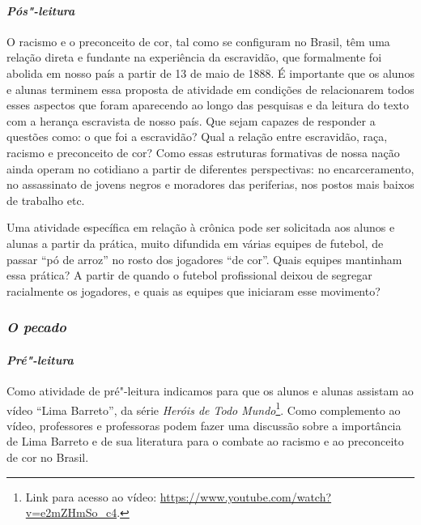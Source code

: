 \documentclass[11pt]{extarticle}
\begin{document}


\paragraph{\textit{Pós"-leitura}}

O racismo e o preconceito de cor, tal como se configuram no Brasil,
têm uma relação direta e fundante na experiência da escravidão, que
formalmente foi abolida em nosso país a partir de 13 de maio de 1888.
É importante que os alunos e alunas terminem essa proposta de atividade em
condições de relacionarem todos esses aspectos que foram aparecendo ao
longo das pesquisas e da leitura do texto com a herança escravista de
nosso país. Que sejam capazes de responder a questões como: o que foi a
escravidão? Qual a relação entre escravidão, raça, racismo e preconceito
de cor? Como essas estruturas formativas de nossa nação ainda operam no
cotidiano a partir de diferentes perspectivas: no encarceramento, no
assassinato de jovens negros e moradores das periferias, nos postos mais
baixos de trabalho etc.

Uma atividade específica em relação à crônica pode ser solicitada aos
alunos e alunas a partir da prática, muito difundida em várias equipes 
de futebol, de passar ``pó de arroz'' no rosto dos jogadores
``de cor''. Quais equipes mantinham essa prática? A partir de quando o
futebol profissional deixou de segregar racialmente os jogadores, e quais
as equipes que iniciaram esse movimento?


\subsubsection{\textit{O pecado}}

\paragraph{\textit{Pré"-leitura}}

Como atividade de pré"-leitura indicamos para que os alunos e alunas
assistam ao vídeo ``Lima Barreto'', da série \emph{Heróis de Todo
Mundo}\footnote{Link para acesso ao vídeo:
  \url{https://www.youtube.com/watch?v=e2mZHmSo_c4}.}. Como complemento
ao vídeo, professores e professoras podem fazer uma discussão sobre a
importância de Lima Barreto e de sua literatura para o combate ao
racismo e ao preconceito de cor no Brasil.
\end{document}
